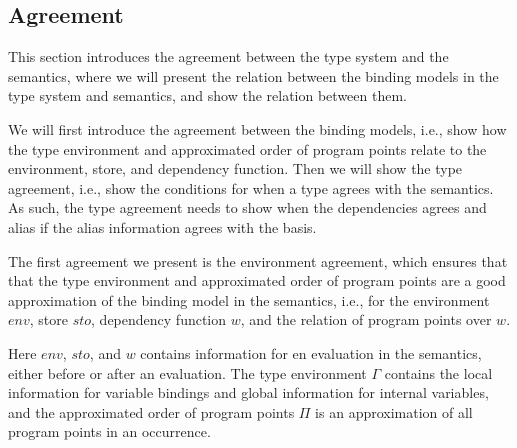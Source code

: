 \documentclass[acmsmall,sigplan]{acmart}
\begin{document}
\subsection{Agreement}
This section introduces the agreement between the type system and the
semantics, where we will present the relation between the binding
models in the type system and semantics, and show the relation between
them. 

We will first introduce the agreement between the binding models,
i.e., show how the type environment and approximated order of program
points relate to the environment, store, and dependency function. 
Then we will show the type agreement, i.e., show the conditions for when a type agrees with the semantics.
As such, the type agreement needs to show when the dependencies agrees and alias if the alias information agrees with the basis.
 
The first agreement we present is the environment agreement, which ensures that that the type environment and approximated order of program points are a good approximation of the binding model in the semantics, i.e., 
for the environment $env$, store $sto$, dependency function $w$, and the relation of program points over $w$.

Here $env$, $sto$, and $w$ contains information for en evaluation in the semantics, either before or after an evaluation.
The type environment $\Gamma$ contains the local information for variable bindings and global information for internal variables, and the approximated order of program points $\Pi$ is an approximation of all program points in an occurrence.
\end{document}

